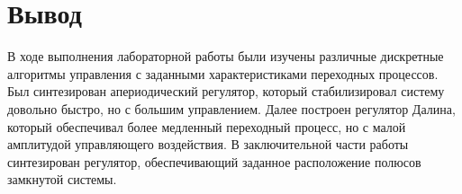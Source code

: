 \chapter{Вывод}
\label{ch:chap6}

В ходе выполнения лабораторной работы были изучены различные дискретные алгоритмы управления с заданными характеристиками переходных процессов. Был синтезирован апериодический регулятор, который стабилизировал систему довольно быстро, но с большим управлением. Далее построен регулятор Далина, который обеспечивал более медленный переходный процесс, но с малой амплитудой управляющего воздействия. В заключительной части работы синтезирован регулятор, обеспечивающий заданное расположение полюсов замкнутой системы.

\endinput